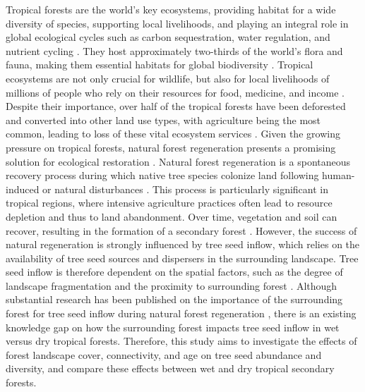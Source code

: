 Tropical forests are the world's key ecosystems, providing habitat for a wide diversity of species, supporting local livelihoods, and playing an integral role in global ecological cycles such as carbon sequestration, water regulation, and nutrient cycling \citep{bormaCarbonContributionsSouth2022}. They host approximately two-thirds of the world's flora and fauna, making them essential habitats for global biodiversity \citep{mulatuBiodiversityMonitoringChanging2017}. Tropical ecosystems are not only crucial for wildlife, but also for local livelihoods of millions of people who rely on their resources for food, medicine, and income \citep{bormaCarbonContributionsSouth2022}. Despite their importance, over half of the tropical forests have been deforested and converted into other land use types, with agriculture being the most common, leading to loss of these vital ecosystem services \citep{chazdonNaturalRegenerationTool2016, arroyo-rodriguezMultipleSuccessionalPathways2017}. Given the growing pressure on tropical forests, natural forest regeneration presents a promising solution for ecological restoration \citep{hordijkLandUseHistory2024}. Natural forest regeneration is a spontaneous recovery process during which native tree species colonize land following human-induced or natural disturbances \citep{crouzeillesEcologicalRestorationSuccess2017}. This process is particularly significant in tropical regions, where intensive agriculture practices often lead to resource depletion and thus to land abandonment. Over time, vegetation and soil can recover, resulting in the formation of a secondary forest \citep{chazdonSecondGrowthPromise2014}. However, the success of natural regeneration is strongly influenced by tree seed inflow, which relies on the availability of tree seed sources and dispersers in the surrounding landscape. Tree seed inflow is therefore dependent on the spatial factors, such as the degree of landscape fragmentation and the proximity to surrounding forest \citep{arroyo-rodriguezMultipleSuccessionalPathways2017}. Although substantial research has been published on the importance of the surrounding forest for tree seed inflow during natural forest regeneration \citep{dentUnitingNicheDifferentiation2021, arroyo-rodriguezMultipleSuccessionalPathways2017, v.h.safarLandscapeOpennessHas2022}, there is an existing knowledge gap on how the surrounding forest impacts tree seed inflow in wet versus dry tropical forests. Therefore, this study aims to investigate the effects of forest landscape cover, connectivity, and age on tree seed abundance and diversity, and compare these effects between wet and dry tropical secondary forests.

